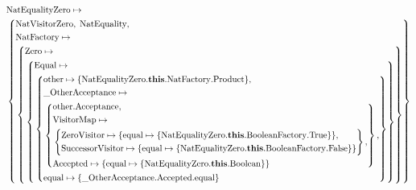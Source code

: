 {\small
  \[
    \begin{aligned}
      &\mathrm{NatEqualityZero} \mapsto \\
      &\left\{
      \begin{aligned}
        &\mathrm{NatVisitorZero},\; \mathrm{NatEquality},\\
        &\mathrm{NatFactory} \mapsto \\
        &\left\{
        \begin{aligned}
        &\mathrm{Zero} \mapsto \\
        &\left\{
        \begin{aligned}
        &\mathrm{Equal} \mapsto \\
        &\left\{
                  \begin{aligned}
                    &\mathrm{other} \mapsto \{\mathrm{NatEqualityZero}.\mathbf{this}.\mathrm{NatFactory}.\mathrm{Product}\},\\
                    &\mathrm{\_OtherAcceptance} \mapsto \\
                    &\left\{
                      \begin{aligned}
                        &\mathrm{other}.\mathrm{Acceptance},\\
                        &\mathrm{VisitorMap} \mapsto \\
                        &\left\{
                          \begin{aligned}
                            &\mathrm{ZeroVisitor} \mapsto \{\mathrm{equal} \mapsto \{\mathrm{NatEqualityZero}.\mathbf{this}.\mathrm{BooleanFactory}.\mathrm{True}\}\},\\
                            &\mathrm{SuccessorVisitor} \mapsto \{\mathrm{equal} \mapsto \{\mathrm{NatEqualityZero}.\mathbf{this}.\mathrm{BooleanFactory}.\mathrm{False}\}\}
                        \end{aligned}\right\},\\
                        &\mathrm{Accepted} \mapsto \{\mathrm{equal} \mapsto \{\mathrm{NatEqualityZero}.\mathbf{this}.\mathrm{Boolean}\}\}
                    \end{aligned}\right\},\\
                    &\mathrm{equal} \mapsto \{\mathrm{\_OtherAcceptance}.\mathrm{Accepted}.\mathrm{equal}\}
                \end{aligned}\right\}
        \end{aligned}\right\}
        \end{aligned}\right\}
    \end{aligned}\right\}
    \end{aligned}
\]}

